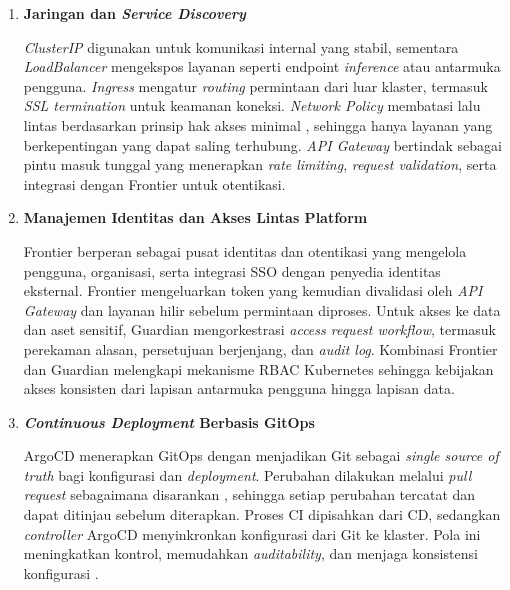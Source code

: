 \begin{enumerate}
    \vspace{0.5em}

    \item \textbf{Jaringan dan \textit{Service Discovery}}  

    \textit{ClusterIP} digunakan untuk komunikasi internal yang stabil, sementara \textit{LoadBalancer} mengekspos layanan seperti endpoint \textit{inference} atau antarmuka pengguna. \textit{Ingress} mengatur \textit{routing} permintaan dari luar klaster, termasuk \textit{SSL termination} untuk keamanan koneksi. \textit{Network Policy} membatasi lalu lintas berdasarkan prinsip hak akses minimal \autocite{ahmad2024mlops}, sehingga hanya layanan yang berkepentingan yang dapat saling terhubung. \textit{API Gateway} bertindak sebagai pintu masuk tunggal yang menerapkan \textit{rate limiting}, \textit{request validation}, serta integrasi dengan Frontier untuk otentikasi.

    \vspace{0.5em}

    \item \textbf{Manajemen Identitas dan Akses Lintas Platform}  

    Frontier berperan sebagai pusat identitas dan otentikasi yang mengelola pengguna, organisasi, serta integrasi SSO dengan penyedia identitas eksternal. Frontier mengeluarkan token yang kemudian divalidasi oleh \textit{API Gateway} dan layanan hilir sebelum permintaan diproses. Untuk akses ke data dan aset sensitif, Guardian mengorkestrasi \textit{access request workflow}, termasuk perekaman alasan, persetujuan berjenjang, dan \textit{audit log}. Kombinasi Frontier dan Guardian melengkapi mekanisme RBAC Kubernetes sehingga kebijakan akses konsisten dari lapisan antarmuka pengguna hingga lapisan data.

    \vspace{0.5em}

    \item \textbf{\textit{Continuous Deployment} Berbasis GitOps}  

    ArgoCD menerapkan GitOps dengan menjadikan Git sebagai \textit{single source of truth} bagi konfigurasi dan \textit{deployment}. Perubahan dilakukan melalui \textit{pull request} sebagaimana disarankan \textcite{limoncelli2022gitops}, sehingga setiap perubahan tercatat dan dapat ditinjau sebelum diterapkan. Proses CI dipisahkan dari CD, sedangkan \textit{controller} ArgoCD menyinkronkan konfigurasi dari Git ke klaster. Pola ini meningkatkan kontrol, memudahkan \textit{auditability}, dan menjaga konsistensi konfigurasi \autocite{limoncelli2022gitops,devopshandbook2016,kreuzberger2023mlops}.


\end{enumerate}
